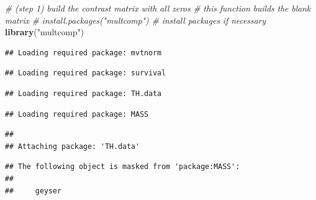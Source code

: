 \documentclass[
  10pt,
]{book}
\newenvironment{Shaded}{\begin{snugshade}}{\end{snugshade}}
\newcommand{\CommentTok}[1]{\textcolor[rgb]{0.56,0.35,0.01}{\textit{#1}}}
\newcommand{\KeywordTok}[1]{\textcolor[rgb]{0.13,0.29,0.53}{\textbf{#1}}}
\newcommand{\NormalTok}[1]{#1}
\newcommand{\StringTok}[1]{\textcolor[rgb]{0.31,0.60,0.02}{#1}}
\begin{document}
\begin{Shaded}
\begin{Highlighting}[]
\CommentTok{\# (step 1) build the contrast matrix with all zeros}
\CommentTok{\# this function builds the blank matrix }
\CommentTok{\# install.packages("multcomp") \# install packages if necessary}
\KeywordTok{library}\NormalTok{(}\StringTok{"multcomp"}\NormalTok{)}
\end{Highlighting}
\end{Shaded}

\begin{verbatim}
## Loading required package: mvtnorm
\end{verbatim}

\begin{verbatim}
## Loading required package: survival
\end{verbatim}

\begin{verbatim}
## Loading required package: TH.data
\end{verbatim}

\begin{verbatim}
## Loading required package: MASS
\end{verbatim}

\begin{verbatim}
## 
## Attaching package: 'TH.data'
\end{verbatim}

\begin{verbatim}
## The following object is masked from 'package:MASS':
## 
##     geyser
\end{verbatim}
\end{document}
